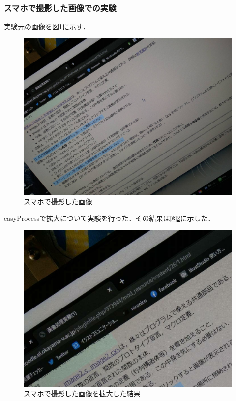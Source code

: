 \documentclass[11pt]{jarticle}
\begin{document}
\subsubsection{スマホで撮影した画像での実験}
実験元の画像を図\ref{1-10.jpg}に示す．
\begin{figure}[htbp]
    \centering
    \includegraphics[scale=.1]{1-10.jpg}
    \caption{スマホで撮影した画像}
    \label{1-10.jpg}
\end{figure}

easyProcessで拡大について実験を行った．その結果は図\ref{1-11.jpg}に示した．
\begin{figure}[htbp]
    \centering
    \includegraphics[scale=.1]{1-11.jpg}
    \caption{スマホで撮影した画像を拡大した結果}
    \label{1-11.jpg}
\end{figure}
\end{document}
